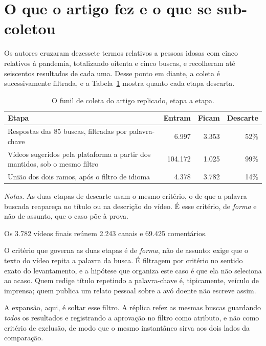 \section{O que o artigo fez e o que se sub-coletou}

Os autores cruzaram dezessete termos relativos a pessoas idosas com cinco relativos à
pandemia, totalizando oitenta e cinco buscas, e recolheram até seiscentos resultados
de cada uma. Desse ponto em diante, a coleta é sucessivamente filtrada, e a
Tabela~\ref{tab:youtube-funil} mostra quanto cada etapa descarta.

\begin{table}[htbp]
\centering\footnotesize
\caption[O funil de coleta do artigo replicado]{O funil de coleta do artigo
replicado, etapa a etapa.}
\label{tab:youtube-funil}
\begin{tabularx}{\textwidth}{@{}Xrrr@{}}
\toprule
Etapa & Entram & Ficam & Descarte \\
\midrule
Respostas das 85 buscas, filtradas por palavra-chave & 6.997 & 3.353 & 52\% \\
\addlinespace[2pt]
Vídeos sugeridos pela plataforma a partir dos mantidos, sob o mesmo filtro & 104.172 & 1.025 & 99\% \\
\addlinespace[2pt]
União dos dois ramos, após o filtro de idioma & 4.378 & 3.782 & 14\% \\
\bottomrule
\end{tabularx}

\vspace{2pt}
{\footnotesize \textit{Notas.} As duas etapas de descarte usam o mesmo critério, o de
que a palavra buscada reapareça no título ou na descrição do vídeo. É esse critério, de
\emph{forma} e não de assunto, que o caso põe à prova.\par}
\end{table}

\noindent Os 3.782 vídeos finais reúnem 2.243 canais e 69.425 comentários.

O critério que governa as duas etapas é de \emph{forma}, não de assunto: exige que o
texto do vídeo repita a palavra da busca. É filtragem por critério no sentido exato
do levantamento, e a hipótese que organiza este caso é que ela não seleciona ao
acaso. Quem redige título repetindo a palavra-chave é, tipicamente, veículo de
imprensa; quem publica um relato pessoal sobre a avó doente não escreve assim.

A expansão, aqui, é soltar esse filtro. A réplica refez as mesmas buscas guardando
\emph{todos} os resultados e registrando a aprovação no filtro como atributo, e não
como critério de exclusão, de modo que o mesmo instantâneo sirva aos dois lados da
comparação.

